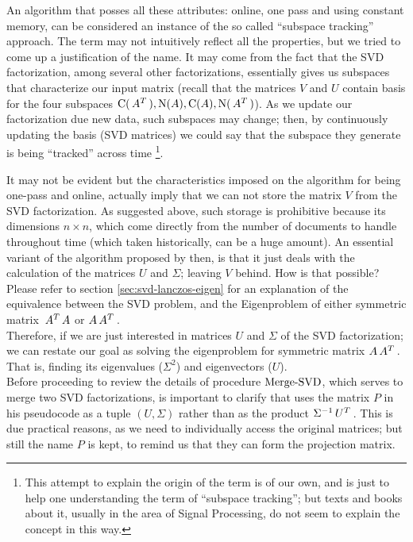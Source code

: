 An algorithm that posses all these attributes: online, one pass and
using constant memory, can be considered an instance of the so called
``subspace tracking'' approach. The term may not intuitively reflect
all the properties, but we tried to come up a justification of the
name. It may come from the fact that the
SVD factorization, among several other factorizations, essentially
gives us subspaces that characterize our input matrix (recall that the
matrices $V$ and $U$ contain basis for the four subspaces
$\operatorname{C}(\,{A}^{T}\,), \operatorname{N}(A), \operatorname{C}(A),  \operatorname{N}(\,{A}^{T}\,)$). As we
update our factorization due new data, such subspaces may change; then, by
continuously updating the basis (SVD matrices) we could say that the
subspace they generate is being ``tracked'' across
time \footnote{This attempt to explain the origin of the 
  term is of our own, and is just to help one understanding the term of
  ``subspace tracking''; but texts and books about it, usually in the
  area of Signal Processing, do not seem to explain the concept in this way.}. 

It may not be evident but the characteristics imposed on the algorithm
for being one-pass and online, actually imply that we can not store
the matrix $V$ from the SVD factorization. As suggested above, such
storage is prohibitive because its dimensions $n \times n$, which come
directly from the number of documents to handle throughout time (which
taken historically, can be a huge amount). An essential variant of the
algorithm proposed by \Rehurek then, is that it just deals with the
calculation of the matrices $U$ and $\Sigma$; leaving $V$ behind. How
is that possible? Please refer to section \cref{sec:svd-lanczos-eigen}
for an explanation of the equivalence between the SVD problem, and the
Eigenproblem of either symmetric matrix $\,{A}^{T}\,A$ or $A\,{A}^{T}\,$. \\

Therefore, if we are just interested in matrices $U$ and $\Sigma$ of
the SVD factorization; we can restate our goal as solving the
eigenproblem for symmetric matrix $A\,{A}^{T}\,$. That is, finding its
eigenvalues ($\Sigma^2$) and eigenvectors ($U$). \\

Before proceeding to review the details of procedure
$\operatorname{Merge-SVD}$, which serves to merge two SVD factorizations, is
important to clarify that \Rehurek uses the matrix $P$ in his
pseudocode as a tuple $(U,\Sigma)$ rather than as the product
${\Sigma}^{-1}\,{U}^{T}\,$. This is due practical reasons, as we need to
individually access the original matrices; but still the name $P$ is
kept, to remind us that they can form the projection matrix. 
